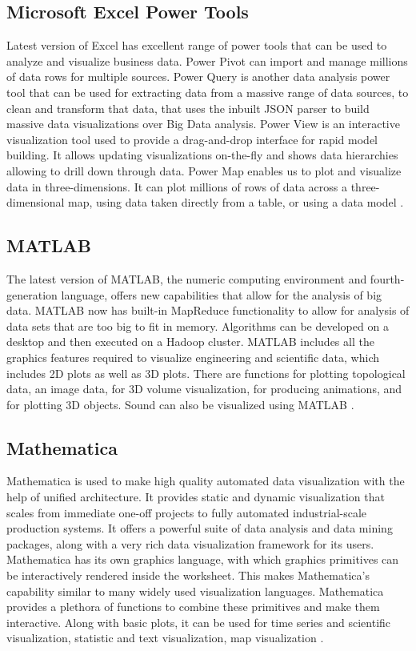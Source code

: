 \subsection*{Microsoft Excel Power Tools}

Latest version of Excel has excellent range of power tools that can be used to analyze and visualize business data. Power Pivot can import and manage millions of data rows for multiple sources. Power Query is another data analysis power tool that can be used for extracting data from a massive range of data sources, to clean and transform that data, that uses the inbuilt JSON parser to build massive data visualizations over Big Data analysis. Power View is an interactive visualization tool used to provide a drag-and-drop interface for rapid model building. It allows updating visualizations on-the-fly and shows data hierarchies allowing to drill down through data. Power Map enables us to plot and visualize data in  three-dimensions. It can plot millions of rows of data across a three-dimensional map, using data taken directly from a table, or using a data model \cite{Excel}.

\subsection*{MATLAB}

The latest version of MATLAB, the numeric computing environment and fourth-generation language, offers new capabilities that allow for the analysis of big data. MATLAB now has built-in MapReduce functionality to allow for analysis of data sets that are too big to fit in memory. Algorithms can be developed on a desktop and then executed on a Hadoop cluster. MATLAB includes all the graphics features required to visualize engineering and scientific data, which includes 2D plots as well as 3D plots. There are functions for plotting topological data, an image data, for 3D volume visualization, for producing animations, and for plotting 3D objects. Sound can also be visualized using MATLAB \cite{MATLAB}.

\subsection*{Mathematica}

Mathematica is used to make high quality automated data visualization with the help of unified architecture. It provides static and dynamic visualization that scales from immediate one-off projects to fully automated industrial-scale production systems. It	offers a powerful suite	of data	analysis and data mining packages, along with a	very rich data visualization framework for its users. Mathematica has its own graphics language,	with which graphics	primitives can be interactively	rendered inside	the	worksheet. This makes Mathematica’s	capability similar to many widely used visualization languages.	Mathematica	provides a plethora	of functions to	combine	these primitives and make them interactive. Along with basic plots, it can be used for time series and scientific visualization, statistic and text visualization, map visualization \cite{Mathematica}.\\

